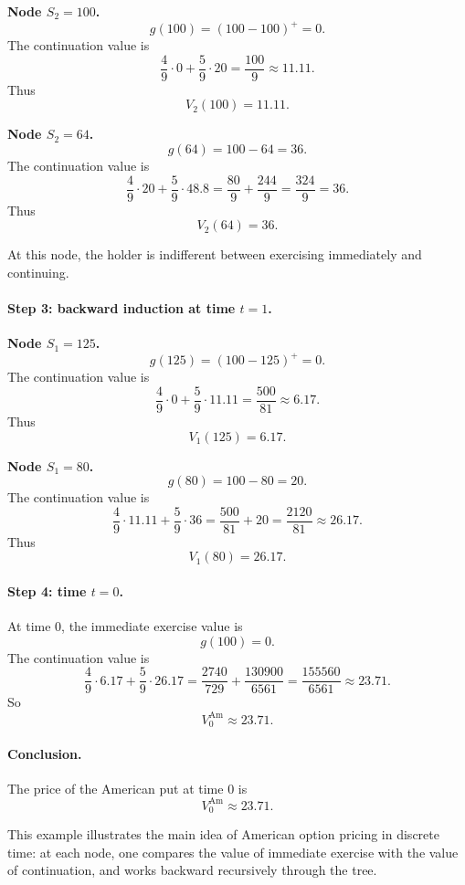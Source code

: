 \documentclass[11pt]{article}
\theoremstyle{definition}
\theoremstyle{plain}
\begin{document}
\medskip

\noindent
\textbf{Node \(S_2=100\).}
\[
g(100)=(100-100)^+=0.
\]
The continuation value is
\[
\frac49\cdot 0+\frac59\cdot 20=\frac{100}{9}\approx 11.11.
\]
Thus
\[
V_2(100)=11.11.
\]

\medskip

\noindent
\textbf{Node \(S_2=64\).}
\[
g(64)=100-64=36.
\]
The continuation value is
\[
\frac49\cdot 20+\frac59\cdot 48.8
=
\frac{80}{9}+\frac{244}{9}
=
\frac{324}{9}
=36.
\]
Thus
\[
V_2(64)=36.
\]

At this node, the holder is indifferent between exercising immediately
and continuing.

\paragraph{Step 3: backward induction at time \(t=1\).}

\noindent
\textbf{Node \(S_1=125\).}
\[
g(125)=(100-125)^+=0.
\]
The continuation value is
\[
\frac49\cdot 0+\frac59\cdot 11.11
=
\frac{500}{81}
\approx 6.17.
\]
Thus
\[
V_1(125)=6.17.
\]

\medskip

\noindent
\textbf{Node \(S_1=80\).}
\[
g(80)=100-80=20.
\]
The continuation value is
\[
\frac49\cdot 11.11+\frac59\cdot 36
=
\frac{500}{81}+20
=
\frac{2120}{81}
\approx 26.17.
\]
Thus
\[
V_1(80)=26.17.
\]

\paragraph{Step 4: time \(t=0\).}

At time \(0\), the immediate exercise value is
\[
g(100)=0.
\]
The continuation value is
\[
\frac49\cdot 6.17+\frac59\cdot 26.17
=
\frac{2740}{729}+\frac{130900}{6561}
=
\frac{155560}{6561}
\approx 23.71.
\]
So
\[
V_0^{\mathrm{Am}} \approx 23.71.
\]

\paragraph{Conclusion.}

The price of the American put at time \(0\) is
\[
\boxed{
V_0^{\mathrm{Am}} \approx 23.71.
}
\]

This example illustrates the main idea of American option pricing in
discrete time:
at each node, one compares the value of immediate exercise with the
value of continuation, and works backward recursively through the tree.
\end{document}
